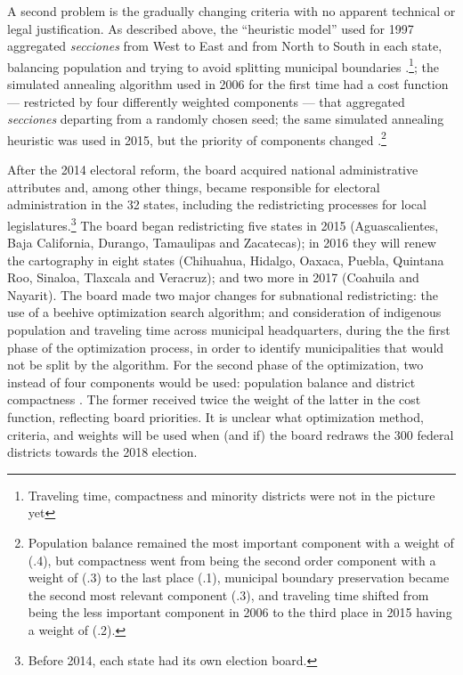 \documentclass[letter,12pt]{article}
\begin{document}

A second problem is the gradually changing criteria with no apparent technical or legal justification. As described above, the ``heuristic model'' used for 1997 aggregated \emph{secciones} from West to East and from North to South in each state, balancing population and trying to avoid splitting municipal boundaries \citep{trelles.mtz.tesisItam.2007}.\footnote{Traveling time, compactness and minority districts were not in the picture yet}; the simulated annealing algorithm used in 2006 for the first time had a cost function --- restricted by four differently weighted components --- that aggregated \emph{secciones} departing from a randomly chosen seed; the same simulated annealing heuristic was used in 2015, but the priority of components changed \citep{acuerdo.ife.2004,acuerdo.ife.2013}.\footnote{Population balance remained the most important component with a weight of (.4), but compactness went from being the second order component with a weight of (.3) to the last place (.1), municipal boundary preservation became the second most relevant component (.3), and traveling time shifted from being the less important component in 2006 to the third place in 2015 having a weight of (.2).} 

After the 2014 electoral reform, the board acquired national administrative attributes and, among other things, became responsible for electoral administration in the 32 states, including the redistricting processes for local legislatures.\footnote{Before 2014, each state had its own election board.} The board began redistricting five states in 2015 (Aguascalientes, Baja California, Durango, Tamaulipas and Zacatecas); in 2016 they will renew the cartography in eight states (Chihuahua, Hidalgo, Oaxaca, Puebla, Quintana Roo, Sinaloa, Tlaxcala and Veracruz); and two more in 2017 (Coahuila and Nayarit). The board made two major changes for subnational redistricting: the use of a beehive optimization search algorithm; and consideration of indigenous population and traveling time across municipal headquarters, during the the first phase of the optimization process, in order to identify municipalities that would not be split by the algorithm. For the second phase of the optimization, two instead of four components would be used: population balance and district compactness \citep{ine.modelo.2015}. The former received twice the weight of the latter in the cost function, reflecting board priorities. It is unclear what optimization method, criteria, and weights will be used when (and if) the board redraws the 300 federal districts towards the 2018 election. 
\end{document}
